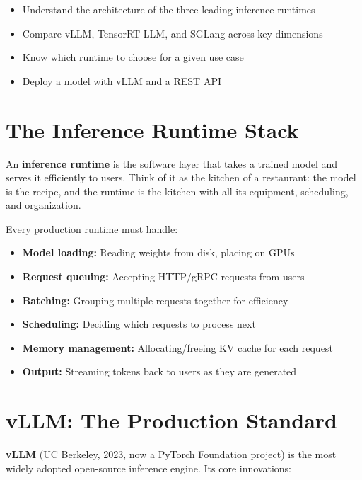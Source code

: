 \documentclass[10pt, oneside, openany]{book}
\newenvironment{learningobjectives}
  {\begin{tcolorbox}[enhanced, breakable,
    colback={rgb,255:red,232;green,240;blue,255},
    colframe=NavyBlue, boxrule=1.5pt, arc=4pt,
    title={\bfseries Learning Objectives},
    fonttitle=\bfseries\color{white},
    attach boxed title to top left={yshift=-2mm, xshift=5mm},
    boxed title style={colback=NavyBlue, arc=2pt}]
  \begin{itemize}[leftmargin=1.5em, itemsep=2pt]}
  {\end{itemize}\end{tcolorbox}}
\newcommand{\keyterm}[1]{\textbf{\color{AccentOrange}#1}}
\begin{document}
\begin{learningobjectives}
  \item Understand the architecture of the three leading inference runtimes
  \item Compare vLLM, TensorRT-LLM, and SGLang across key dimensions
  \item Know which runtime to choose for a given use case
  \item Deploy a model with vLLM and a REST API
\end{learningobjectives}

\section{The Inference Runtime Stack}

An \keyterm{inference runtime} is the software layer that
takes a trained model and serves it efficiently to users.  Think of it as the
kitchen of a restaurant: the model is the recipe, and the runtime is the kitchen
with all its equipment, scheduling, and organization.

Every production runtime must handle:
\begin{itemize}
  \item \textbf{Model loading:} Reading weights from disk, placing on GPUs
  \item \textbf{Request queuing:} Accepting HTTP/gRPC requests from users
  \item \textbf{Batching:} Grouping multiple requests together for efficiency
  \item \textbf{Scheduling:} Deciding which requests to process next
  \item \textbf{Memory management:} Allocating/freeing KV cache for each request
  \item \textbf{Output:} Streaming tokens back to users as they are generated
\end{itemize}

\section{vLLM: The Production Standard}

\keyterm{vLLM} (UC Berkeley, 2023, now a PyTorch Foundation project) is the
most widely adopted open-source inference engine.  Its core innovations:
\end{document}
